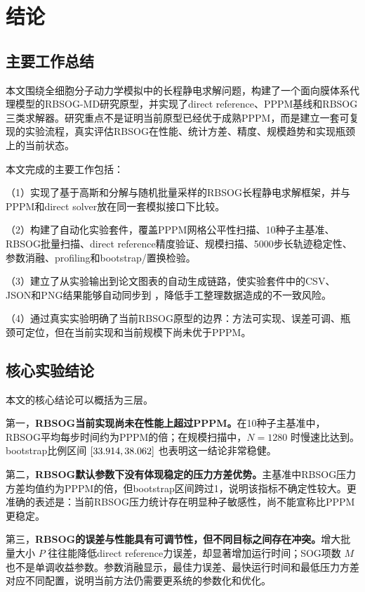 \chapter{结论}\label{chap:conclusion}

\section{主要工作总结}

本文围绕全细胞分子动力学模拟中的长程静电求解问题，构建了一个面向膜体系代理模型的RBSOG-MD研究原型，并实现了direct reference、PPPM基线和RBSOG三类求解器。研究重点不是证明当前原型已经优于成熟PPPM，而是建立一套可复现的实验流程，真实评估RBSOG在性能、统计方差、精度、规模趋势和实现瓶颈上的当前状态。

本文完成的主要工作包括：

（1）实现了基于高斯和分解与随机批量采样的RBSOG长程静电求解框架，并与PPPM和direct solver放在同一套模拟接口下比较。

（2）构建了自动化实验套件，覆盖PPPM网格公平性扫描、10种子主基准、RBSOG批量扫描、direct reference精度验证、规模扫描、5000步长轨迹稳定性、参数消融、profiling和bootstrap/置换检验。

（3）建立了从实验输出到论文图表的自动生成链路，使实验套件中的CSV、JSON和PNG结果能够自动同步到 ，降低手工整理数据造成的不一致风险。

（4）通过真实实验明确了当前RBSOG原型的边界：方法可实现、误差可调、瓶颈可定位，但在当前实现和当前规模下尚未优于PPPM。

\section{核心实验结论}

本文的核心结论可以概括为三层。

第一，\textbf{RBSOG当前实现尚未在性能上超过PPPM。}在10种子主基准中，RBSOG平均每步时间约为PPPM的\RBSOGSlowdownVsPPPM 倍；在规模扫描中，$N=1280$ 时慢速比达到\ScalingSlowdownAtMaxN。bootstrap比例区间 $[33.914,38.062]$ 也表明这一结论非常稳健。

第二，\textbf{RBSOG默认参数下没有体现稳定的压力方差优势。}主基准中RBSOG压力方差均值约为PPPM的\RBSOGVarianceRatioVsPPPM 倍，但bootstrap区间跨过1，说明该指标不确定性较大。更准确的表述是：当前RBSOG压力统计存在明显种子敏感性，尚不能宣称比PPPM更稳定。

第三，\textbf{RBSOG的误差与性能具有可调节性，但不同目标之间存在冲突。}增大批量大小 $P$ 往往能降低direct reference力误差，却显著增加运行时间；SOG项数 $M$ 也不是单调收益参数。参数消融显示，最佳力误差、最快运行时间和最低压力方差对应不同配置，说明当前方法仍需要更系统的参数化和优化。

